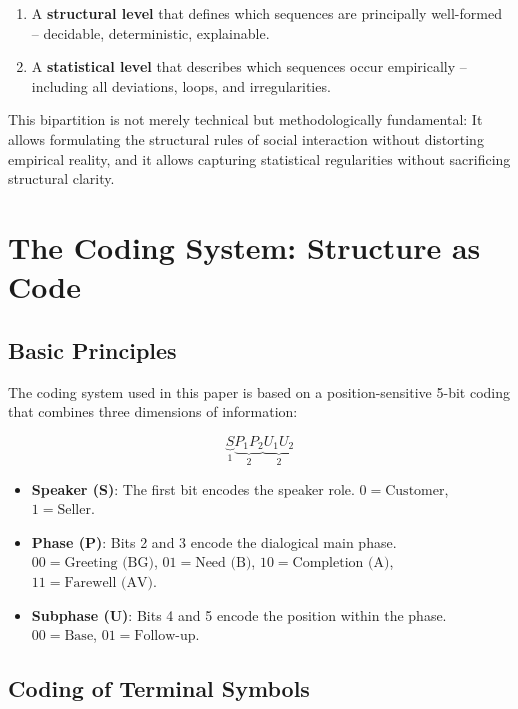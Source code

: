 \documentclass[
  12pt,
  a4paper,
  oneside,
  titlepage
]{article}
\begin{document}
\begin{enumerate}
    \item A \textbf{structural level} that defines which sequences are 
    principally well-formed – decidable, deterministic, explainable.
    
    \item A \textbf{statistical level} that describes which sequences occur 
    empirically – including all deviations, loops, and irregularities.
\end{enumerate}

This bipartition is not merely technical but methodologically fundamental: It 
allows formulating the structural rules of social interaction without distorting 
empirical reality, and it allows capturing statistical regularities without 
sacrificing structural clarity.

\section{The Coding System: Structure as Code}

\subsection{Basic Principles}

The coding system used in this paper is based on a position-sensitive 5-bit 
coding that combines three dimensions of information:

\[
\underbrace{S}_{1} \underbrace{P_1P_2}_{2} \underbrace{U_1U_2}_{2}
\]

\begin{itemize}
    \item \textbf{Speaker (S)}: The first bit encodes the speaker role.
    \(0 = \text{Customer}\), \(1 = \text{Seller}\).
    
    \item \textbf{Phase (P)}: Bits 2 and 3 encode the dialogical main phase.
    \(00 = \text{Greeting (BG)}\), \(01 = \text{Need (B)}\),
    \(10 = \text{Completion (A)}\), \(11 = \text{Farewell (AV)}\).
    
    \item \textbf{Subphase (U)}: Bits 4 and 5 encode the position within the 
    phase. \(00 = \text{Base}\), \(01 = \text{Follow-up}\).
\end{itemize}

\subsection{Coding of Terminal Symbols}
\end{document}

